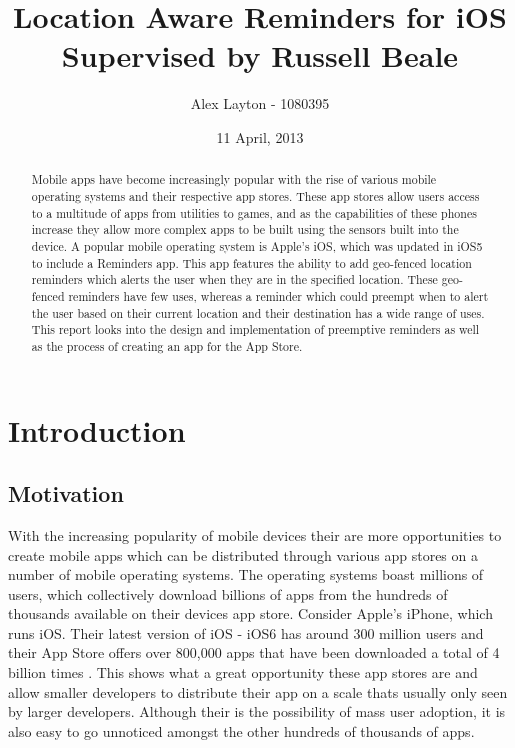 \documentclass[12pt]{report}
\title{Location Aware Reminders for iOS\\ \small{Supervised by Russell Beale}}
\author{Alex Layton - 1080395}
\date{11 April, 2013}
\begin{document}
\maketitle

\begin{abstract}

Mobile apps have become increasingly popular with the rise of various mobile operating systems and their respective app stores. These app stores allow users access to a multitude of apps from utilities to games, and as the capabilities of these phones increase they allow more complex apps to be built using the sensors built into the device. A popular mobile operating system is Apple's iOS, which was updated in iOS5 to include a Reminders app. This app features the ability to add geo-fenced location reminders which alerts the user when they are in the specified location. These geo-fenced reminders have few uses, whereas a reminder which could preempt when to alert the user based on their current location and their destination has a wide range of uses.\\

This report looks into the design and implementation of preemptive reminders as well as the process of creating an app for the App Store.

\end{abstract}

\tableofcontents
\newpage

\chapter{Introduction}

\section{Motivation}

With the increasing popularity of mobile devices their are more opportunities to create mobile apps which can be distributed through various app stores on a number of mobile operating systems. The operating systems boast millions of users, which collectively download billions of apps from the hundreds of thousands available on their devices app store. Consider Apple's iPhone, which runs iOS. Their latest version of iOS - iOS6 has around 300 million users and their App Store offers over 800,000 apps that have been downloaded a total of 4 billion times \cite{applenumbers}. This shows what a great opportunity these app stores are and allow smaller developers to distribute their app on a scale thats usually only seen by larger developers. Although their is the possibility of mass user adoption, it is also easy to go unnoticed amongst the other hundreds of thousands of apps.\\
\end{document}
